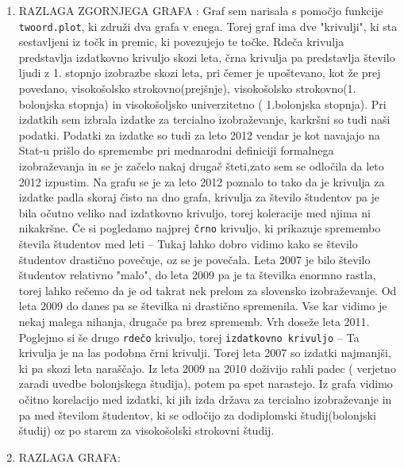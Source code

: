 \documentclass[11pt,a4paper]{article}
\begin{document}
\begin{enumerate}
\begin{enumerate}
\item{RAZLAGA ZGORNJEGA GRAFA} : Graf sem narisala s pomočjo funkcije \verb|twoord.plot|, ki združi dva grafa v enega. Torej graf ima dve "krivulji", ki sta sestavljeni iz točk in premic, ki povezujejo te točke. Rdeča krivulja predstavlja izdatkovno krivuljo skozi leta, črna krivulja pa predstavlja število ljudi z 1. stopnjo izobrazbe skozi leta, pri čemer je upoštevano, kot že prej povedano, visokošolsko strokovno(prejšnje), visokošolsko strokovno(1. bolonjska stopnja) in visokošoljsko univerzitetno ( 1.bolonjska stopnja). Pri izdatkih sem izbrala izdatke za tercialno izobraževanje, karkršni so tudi naši podatki. Podatki za izdatke so tudi za leto 2012 vendar je kot navajajo na Stat-u prišlo do spremembe pri mednarodni definiciji formalnega izobraževanja in se je začelo nakaj drugač šteti,zato sem se odločila da leto 2012 izpustim. Na grafu se je za leto 2012 poznalo to tako da je krivulja za izdatke padla skoraj čisto na dno grafa, krivulja za število študentov pa je bila očutno veliko nad izdatkovno krivuljo, torej koleracije med njima ni nikakršne. Če si pogledamo najprej \verb|črno| krivuljo, ki prikazuje spremembo števila študentov med leti -- Tukaj lahko dobro vidimo kako se število študentov drastično povečuje, oz se je povečala. Leta 2007 je bilo število študentov relativno "malo", do leta 2009 pa je ta številka enormno rastla, torej lahko rečemo da je od takrat nek prelom za slovensko izobraževanje. Od leta 2009 do danes pa se številka ni drastično spremenila. Vse kar vidimo je nekaj malega nihanja, drugače pa brez sprememb. Vrh doseže leta 2011. Poglejmo si še drugo \verb|rdečo| krivuljo, torej \verb|izdatkovno krivuljo| -- Ta krivulja je na las podobna črni krivulji. Torej leta 2007 so izdatki najmanjši, ki pa skozi leta naraščajo. Iz leta 2009 na 2010 doživijo rahli padec ( verjetno zaradi uvedbe bolonjskega študija), potem pa spet narastejo.  Iz grafa vidimo očitno korelacijo med izdatki, ki jih izda država za tercialno izobraževanje in pa med številom študentov, ki se odločijo za dodiplomski študij(bolonjski študij) oz po starem za visokošolski strokovni študij. 


\pagebreak

\item{RAZLAGA GRAFA}:

\end{enumerate}
\end{enumerate}
\end{document}
